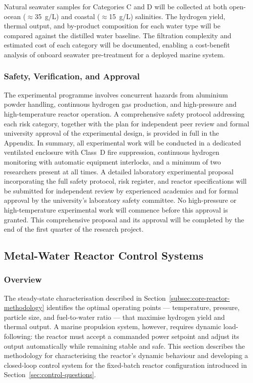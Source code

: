 \documentclass[12pt]{article}
\begin{document}
Natural seawater samples for Categories C and D will be collected at both 
open-ocean (${\approx}$35~g/L) and coastal (${\approx}$15~g/L) salinities. The 
hydrogen yield, thermal output, and by-product composition for each water type will 
be compared against the distilled water baseline. The filtration complexity and 
estimated cost of each category will be documented, enabling a cost-benefit analysis 
of onboard seawater pre-treatment for a deployed marine system.

\subsubsection*{Safety, Verification, and Approval}

The experimental programme involves concurrent hazards from aluminium powder 
handling, continuous hydrogen gas production, and high-pressure and high-temperature 
reactor operation. A comprehensive safety protocol addressing each risk category, 
together with the plan for independent peer review and formal university approval 
of the experimental design, is provided in full in the Appendix. In summary, all 
experimental work will be conducted in a dedicated ventilated enclosure with 
Class~D fire suppression, continuous hydrogen monitoring with automatic equipment 
interlocks, and a minimum of two researchers present at all times. A detailed 
laboratory experimental proposal incorporating the full safety protocol, risk 
register, and reactor specifications will be submitted for independent review by 
experienced academics and for formal approval by the university's laboratory safety 
committee. No high-pressure or high-temperature experimental work will commence 
before this approval is granted. This comprehensive proposal and its approval will 
be completed by the end of the first quarter of the research project.


\subsection{Metal-Water Reactor Control Systems}
\label{sec:control-methodology}

\subsubsection*{Overview}

The steady-state characterisation described in Section~\ref{subsec:core-reactor-methodology} 
identifies the optimal operating points --- temperature, pressure, particle size, 
and fuel-to-water ratio --- that maximise hydrogen yield and thermal output. A 
marine propulsion system, however, requires dynamic load-following: the reactor must 
accept a commanded power setpoint and adjust its output automatically while 
remaining stable and safe. This section describes the methodology for characterising 
the reactor's dynamic behaviour and developing a closed-loop control system for the 
fixed-batch reactor configuration introduced in Section~\ref{sec:control-questions}.
\end{document}
